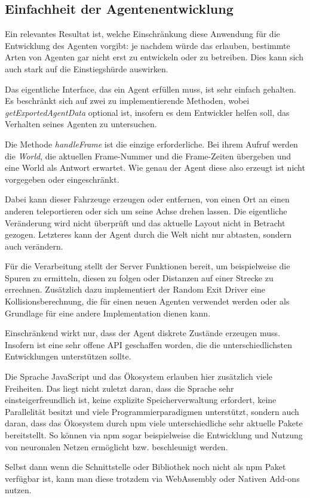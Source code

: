 
\subsection{Einfachheit der Agentenentwicklung}

Ein relevantes Resultat ist, welche Einschränkung diese Anwendung für die Entwicklung des Agenten vorgibt: je nachdem würde das erlauben, bestimmte Arten von Agenten gar nicht erst zu entwickeln oder zu betreiben.
Dies kann sich auch stark auf die Einstiegshürde auswirken.

Das eigentliche Interface, das ein Agent erfüllen muss, ist sehr einfach gehalten.
Es beschränkt sich auf zwei zu implementierende Methoden, wobei \textit{getExportedAgentData} optional ist, insofern es dem Entwickler helfen soll, das Verhalten seines Agenten zu untersuchen.

Die Methode \textit{handleFrame} ist die einzige erforderliche.
Bei ihrem Aufruf werden die \textit{World}, die aktuellen Frame-Nummer und die Frame-Zeiten übergeben und eine World als Antwort erwartet.
Wie genau der Agent diese also erzeugt ist nicht vorgegeben oder eingeschränkt.

Dabei kann dieser Fahrzeuge erzeugen oder entfernen, von einen Ort an einen anderen teleportieren oder sich um seine Achse drehen lassen.
Die eigentliche Veränderung wird nicht überprüft und das aktuelle Layout nicht in Betracht gezogen.
Letzteres kann der Agent durch die Welt nicht nur abtasten, sondern auch verändern.

Für die Verarbeitung stellt der Server Funktionen bereit, um beispielweise die Spuren zu ermitteln, diesen zu folgen oder Distanzen auf einer Strecke zu errechnen.
Zusätzlich dazu implementiert der Random Exit Driver eine Kollisionsberechnung, die für einen neuen Agenten verwendet werden oder als Grundlage für eine andere Implementation dienen kann.

Einschränkend wirkt nur, dass der Agent diskrete Zustände erzeugen muss.
Insofern ist eine sehr offene API geschaffen worden, die die unterschiedlichsten Entwicklungen unterstützen sollte.

Die Sprache JavaScript und das Ökosystem erlauben hier zusätzlich viele Freiheiten.
Das liegt nicht zuletzt daran, dass die Sprache sehr einsteigerfreundlich ist, keine explizite Speicherverwaltung erfordert, keine Parallelität besitzt und viele Programmierparadigmen unterstützt, sondern auch daran, dass das Ökosystem durch npm viele unterschiedliche sehr aktuelle Pakete bereitstellt.
So können via npm sogar beispielweise die Entwicklung und Nutzung von neuronalen Netzen ermöglicht bzw. beschleunigt werden\autocite{tensorflowTut2022}.

Selbst dann wenn die Schnittstelle oder Bibliothek noch nicht als npm Paket verfügbar ist, kann man diese trotzdem via WebAssembly oder Nativen Add-ons nutzen.
